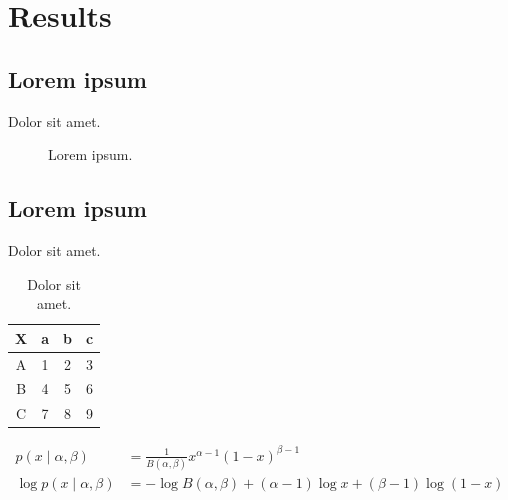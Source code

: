 \documentclass[main.tex]{subfiles}
\begin{document}
\section{Results}

\subsection{Lorem ipsum}

Dolor sit amet\cite{LoremIpsum2018}.

\begin{figure}[H]
    \centering
    \caption{Lorem ipsum.}
\end{figure}

\subsection{Lorem ipsum}

Dolor sit amet.

\begin{table}[H]
    \centering

    \begin{tabular}{cccc}
        \hline
        X & a & b & c \tabularnewline
        \hline
        \hline
        A & 1 & 2 & 3 \tabularnewline
        B & 4 & 5 & 6 \tabularnewline
        C & 7 & 8 & 9 \tabularnewline
        \hline
    \end{tabular}

    \caption{Dolor sit amet.}
\end{table}

\begin{align}
    p\left(x \mid \alpha, \beta \right)
     & = \frac{
             1
         }{
             B(\alpha, \beta)
         }
         x^{\alpha - 1} {(1 - x)}^{\beta - 1}
    \\
    \log p\left(x \mid \alpha, \beta \right)
     & = - \log B(\alpha, \beta)
       + (\alpha - 1) \log x
       + (\beta - 1) \log (1 - x)
\end{align}
\end{document}
